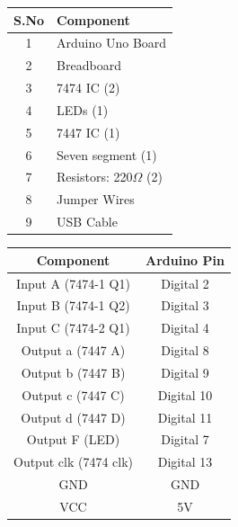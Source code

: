 \documentclass[a4paper,12pt]{article}
\begin{document}
\begin{center}
\begin{minipage}{0.45\textwidth}
\begin{table}[H]
\centering
\begin{tabular}{|c|l|}
\hline
\textbf{S.No} & \textbf{Component} \\ \hline
1 & Arduino Uno Board \\
2 & Breadboard \\
3 & 7474 IC (2) \\
4 & LEDs (1) \\
5 & 7447 IC (1) \\
6 & Seven segment (1) \\
7 & Resistors: 220$\Omega$ (2) \\
8 & Jumper Wires \\
9 & USB Cable \\
\hline
\end{tabular}
\end{table}
\end{minipage}
\hspace{0.05\textwidth}
\begin{minipage}{0.45\textwidth}
\begin{table}[H]
\centering
\begin{tabular}{|c|c|}
\hline
\textbf{Component} & \textbf{Arduino Pin} \\ \hline
Input A (7474-1 Q1) & Digital 2 \\
Input B (7474-1 Q2) & Digital 3 \\
Input C (7474-2 Q1) & Digital 4 \\
Output a (7447 A) & Digital 8 \\
Output b (7447 B) & Digital 9 \\
Output c (7447 C) & Digital 10 \\
Output d (7447 D) & Digital 11 \\
Output F (LED) & Digital 7 \\
Output clk (7474 clk) & Digital 13 \\
GND & GND \\
VCC & 5V \\
\hline
\end{tabular}
\end{table}
\end{minipage}
\end{center}
\end{document}
